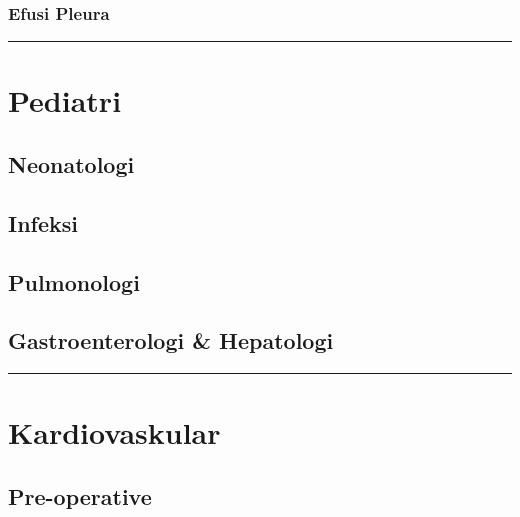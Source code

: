 \documentclass[
]{book}
\begin{document}
\hypertarget{efusi-pleura}{%
\subsubsection{Efusi Pleura}\label{efusi-pleura}}

\begin{center}\rule{0.5\linewidth}{0.5pt}\end{center}

\hypertarget{pediatri-1}{%
\section{Pediatri}\label{pediatri-1}}

\hypertarget{neonatologi}{%
\subsection{Neonatologi}\label{neonatologi}}

\hypertarget{infeksi-2}{%
\subsection{Infeksi}\label{infeksi-2}}

\hypertarget{pulmonologi-1}{%
\subsection{Pulmonologi}\label{pulmonologi-1}}

\hypertarget{gastroenterologi-hepatologi-1}{%
\subsection{Gastroenterologi \& Hepatologi}\label{gastroenterologi-hepatologi-1}}

\begin{center}\rule{0.5\linewidth}{0.5pt}\end{center}

\hypertarget{kardiovaskular-2}{%
\section{Kardiovaskular}\label{kardiovaskular-2}}

\hypertarget{pre-operative}{%
\subsection{Pre-operative}\label{pre-operative}}
\end{document}
